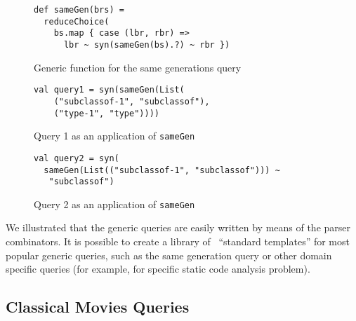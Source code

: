 
\begin{figure}[h]
\begin{lstlisting}
def sameGen(brs) =
  reduceChoice(
    bs.map { case (lbr, rbr) =>
      lbr ~ syn(sameGen(bs).?) ~ rbr })
\end{lstlisting}
\caption{Generic function for the same generations query}
\label{fig:gen}
\end{figure}


\begin{figure}[h]
\begin{lstlisting}
val query1 = syn(sameGen(List(
    ("subclassof-1", "subclassof"),
    ("type-1", "type"))))
\end{lstlisting}
\caption{Query 1 as an application of \lstinline{sameGen}}
\label{fig:query1Gen}
\end{figure}


\begin{figure}[h]
\begin{lstlisting}
val query2 = syn(
  sameGen(List(("subclassof-1", "subclassof"))) ~
   "subclassof")
\end{lstlisting}
\caption{Query 2 as an application of \lstinline{sameGen}}
\label{fig:query2Gen}
\end{figure}


We illustrated that the generic queries are easily written by means of the parser combinators.
It is possible to create a library of \ ``standard templates'' for most popular generic queries, such as the same generation query or other domain specific queries (for example, for specific static code analysis problem).


\subsection{Classical Movies Queries}

